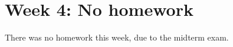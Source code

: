 \documentclass[8.01x]{subfiles}
\begin{document}
\chapter{Week 4: No homework}

There was no homework this week, due to the midterm exam.
\end{document}
